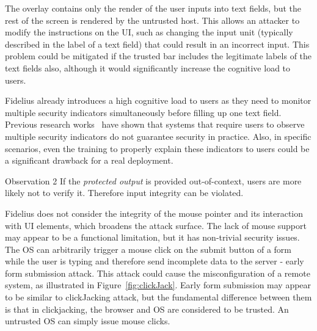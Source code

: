 The overlay contains only the render of the user inputs into text fields, but the rest of the screen is rendered by the untrusted host.
This allows an attacker to modify the instructions on the UI, such as changing the input unit (typically described in the label of a text field) that could result in an incorrect input. This problem could be mitigated if the trusted bar includes the legitimate labels of the text fields also, although it would significantly increase the cognitive load to users.

Fidelius already introduces a high cognitive load to users as they need to monitor multiple security indicators simultaneously before filling up one text field. Previous research works~\cite{egelman2008you,sobey2008exploring, anderson2016warning} have shown that systems that require users to observe multiple security indicators %
do not guarantee security in practice.
Also, in specific scenarios, even the training to properly explain these indicators to users could be a significant drawback for a real deployment.


\begin{mybox}[colback=white]{Observation 2}
If the \emph{protected output} is provided out-of-context, users are more likely not to verify it. Therefore input integrity can be violated.
\end{mybox}



Fidelius does not consider the integrity of the mouse pointer and its interaction with UI elements, which broadens the attack surface. The lack of mouse support may appear to be a functional limitation, but it has non-trivial security issues.
The OS can arbitrarily trigger a mouse click on the submit button of a form while the user is typing and therefore send incomplete data to the server - early form submission attack.
This attack could cause the misconfiguration of a remote system, as illustrated in Figure~\ref{fig:clickJack}. Early form submission may appear to be similar to clickJacking attack, but the fundamental difference between them is that in clickjacking, the browser and OS are considered to be trusted. An untrusted OS can simply issue mouse clicks.


